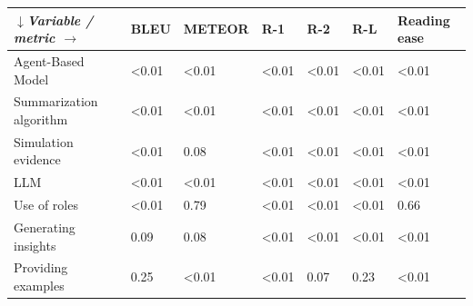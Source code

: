 \begin{tabular}{|l|l|l|l|l|l|l|}
\hline
\textit{$\downarrow$Variable / metric $\rightarrow$} & BLEU & METEOR & R-1 & R-2 & R-L & Reading ease \\
 \hline
 Agent-Based Model & \textless{}0.01 & \textless{}0.01 & \textless{}0.01 & \textless{}0.01 & \textless{}0.01 & \textless{}0.01 \\
 \hline
 Summarization algorithm & \textless{}0.01 & \textless{}0.01 & \textless{}0.01 & \textless{}0.01 & \textless{}0.01 & \textless{}0.01 \\
 \hline
 Simulation evidence & \textless{}0.01 & 0.08 & \textless{}0.01 & \textless{}0.01 & \textless{}0.01 & \textless{}0.01 \\
 \hline
 LLM & \textless{}0.01 & \textless{}0.01 & \textless{}0.01 & \textless{}0.01 & \textless{}0.01 & \textless{}0.01 \\
 \hline
 Use of roles & \textless{}0.01 & 0.79 & \textless{}0.01 & \textless{}0.01 & \textless{}0.01 & 0.66 \\
 \hline
 Generating insights & 0.09 & 0.08 & \textless{}0.01 & \textless{}0.01 & \textless{}0.01 & \textless{}0.01 \\
 \hline
 Providing examples & 0.25 & \textless{}0.01 & \textless{}0.01 & 0.07 & 0.23 & \textless{}0.01 \\
\hline
\end{tabular}
